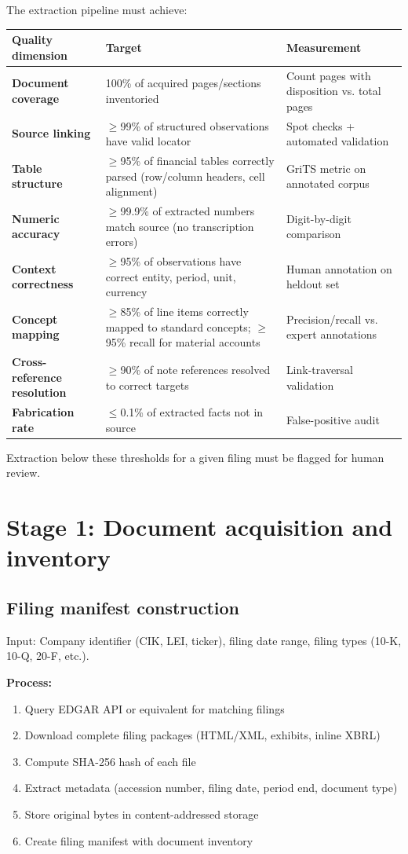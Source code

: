 The extraction pipeline must achieve:

\begin{longtable}{L{35mm}L{50mm}L{51mm}}
\toprule Quality dimension & Target & Measurement\\\midrule\endhead
\textbf{Document coverage} & 100\% of acquired pages/sections inventoried &
Count pages with disposition vs. total pages\\
\textbf{Source linking} & $\geq$99\% of structured observations have valid locator &
Spot checks + automated validation\\
\textbf{Table structure} & $\geq$95\% of financial tables correctly parsed
(row/column headers, cell alignment) & GriTS metric on annotated corpus\\
\textbf{Numeric accuracy} & $\geq$99.9\% of extracted numbers match source (no
transcription errors) & Digit-by-digit comparison\\
\textbf{Context correctness} & $\geq$95\% of observations have correct entity,
period, unit, currency & Human annotation on heldout set\\
\textbf{Concept mapping} & $\geq$85\% of line items correctly mapped to standard
concepts; $\geq$95\% recall for material accounts & Precision/recall vs. expert annotations\\
\textbf{Cross-reference resolution} & $\geq$90\% of note references resolved to
correct targets & Link-traversal validation\\
\textbf{Fabrication rate} & $\leq$0.1\% of extracted facts not in source &
False-positive audit\\
\bottomrule
\end{longtable}

Extraction below these thresholds for a given filing must be flagged for human review.

\section{Stage 1: Document acquisition and inventory}

\subsection{Filing manifest construction}

Input: Company identifier (CIK, LEI, ticker), filing date range, filing types
(10-K, 10-Q, 20-F, etc.).

\textbf{Process:}
\begin{enumerate}
\item Query EDGAR API or equivalent for matching filings
\item Download complete filing packages (HTML/XML, exhibits, inline XBRL)
\item Compute SHA-256 hash of each file
\item Extract metadata (accession number, filing date, period end, document type)
\item Store original bytes in content-addressed storage
\item Create filing manifest with document inventory
\end{enumerate}


